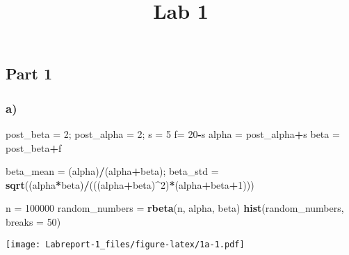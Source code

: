 \documentclass[]{article}
\title{Lab 1}
\author{}
\date{\vspace{-2.5em}}
\newenvironment{Shaded}{\begin{snugshade}}{\end{snugshade}}
\newcommand{\DataTypeTok}[1]{\textcolor[rgb]{0.13,0.29,0.53}{#1}}
\newcommand{\DecValTok}[1]{\textcolor[rgb]{0.00,0.00,0.81}{#1}}
\newcommand{\KeywordTok}[1]{\textcolor[rgb]{0.13,0.29,0.53}{\textbf{#1}}}
\newcommand{\NormalTok}[1]{#1}
\newcommand{\OperatorTok}[1]{\textcolor[rgb]{0.81,0.36,0.00}{\textbf{#1}}}
\newcommand{\StringTok}[1]{\textcolor[rgb]{0.31,0.60,0.02}{#1}}
\begin{document}
\maketitle

\hypertarget{part-1}{%
\subsection{Part 1}\label{part-1}}

\hypertarget{a}{%
\subsubsection{a)}\label{a}}

\begin{Shaded}
\begin{Highlighting}[]
\NormalTok{post_beta =}\StringTok{ }\DecValTok{2}\NormalTok{;}
\NormalTok{post_alpha =}\StringTok{ }\DecValTok{2}\NormalTok{;}
\NormalTok{s =}\StringTok{ }\DecValTok{5}
\NormalTok{f=}\StringTok{ }\DecValTok{20}\OperatorTok{-}\NormalTok{s}
\NormalTok{alpha =}\StringTok{ }\NormalTok{post_alpha}\OperatorTok{+}\NormalTok{s}
\NormalTok{beta =}\StringTok{ }\NormalTok{post_beta}\OperatorTok{+}\NormalTok{f}

\NormalTok{beta_mean =}\StringTok{ }\NormalTok{(alpha)}\OperatorTok{/}\NormalTok{(alpha}\OperatorTok{+}\NormalTok{beta);}
\NormalTok{beta_std =}\StringTok{ }\KeywordTok{sqrt}\NormalTok{((alpha}\OperatorTok{*}\NormalTok{beta)}\OperatorTok{/}\NormalTok{(((alpha}\OperatorTok{+}\NormalTok{beta)}\OperatorTok{^}\DecValTok{2}\NormalTok{)}\OperatorTok{*}\NormalTok{(alpha}\OperatorTok{+}\NormalTok{beta}\OperatorTok{+}\DecValTok{1}\NormalTok{)))}

\NormalTok{n =}\StringTok{ }\DecValTok{100000}
\NormalTok{random_numbers =}\StringTok{ }\KeywordTok{rbeta}\NormalTok{(n, alpha, beta)}
\KeywordTok{hist}\NormalTok{(random_numbers, }\DataTypeTok{breaks =} \DecValTok{50}\NormalTok{)}
\end{Highlighting}
\end{Shaded}

\texttt{[image: Labreport-1\_files/figure-latex/1a-1.pdf]}
\end{document}
